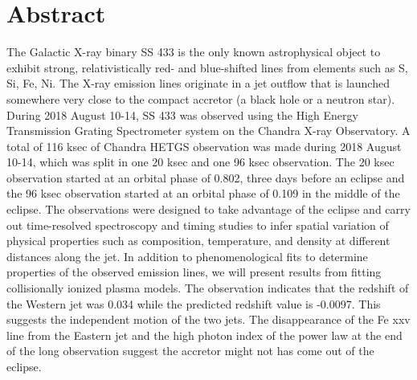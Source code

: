 \chapter{Abstract}
The Galactic X-ray binary SS 433 is the only known astrophysical object to exhibit strong, relativistically red- and blue-shifted lines from elements such as S, Si, Fe, Ni. The X-ray emission lines originate in a jet outflow that is launched somewhere very close to the compact accretor (a black hole or a neutron star). During 2018 August 10-14, SS 433 was observed using the High Energy Transmission Grating Spectrometer system on the Chandra X-ray Observatory. A total of 116 ksec of Chandra HETGS observation was made during 2018 August 10-14, which was split in one 20 ksec and one 96 ksec observation. The 20 ksec observation started at an orbital phase of 0.802, three days before an eclipse and the 96 ksec observation started at an orbital phase of 0.109 in the middle of the eclipse. The observations were designed to take advantage of the eclipse and carry out time-resolved spectroscopy and timing studies to infer spatial variation of physical properties such as composition, temperature, and density at different distances along the jet. In addition to phenomenological fits to determine properties of the observed emission lines, we will present results from fitting collisionally ionized plasma models. The observation indicates that the redshift of the Western jet was 0.034 while the predicted redshift value is -0.0097. This suggests the independent motion of the two jets. The disappearance of the Fe {\sc xxv} line from the Eastern jet and the high photon index of the power law at the end of the long observation suggest the accretor might not has come out of the eclipse. 